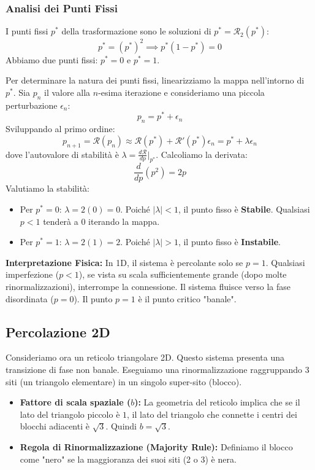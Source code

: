\subsubsection{Analisi dei Punti Fissi}
I punti fissi $p^*$ della trasformazione sono le soluzioni di $p^* = \mathcal{R}_2(p^*)$:
\begin{equation}
    p^* = (p^*)^2 \implies p^*(1 - p^*) = 0
\end{equation}
Abbiamo due punti fissi: $p^* = 0$ e $p^* = 1$.

\noindent Per determinare la natura dei punti fissi, linearizziamo la mappa nell'intorno di $p^*$. Sia $p_n$ il valore alla $n$-esima iterazione e consideriamo una piccola perturbazione $\epsilon_n$:
\begin{equation}
    p_n = p^* + \epsilon_n
\end{equation}
Sviluppando al primo ordine:
\begin{equation}
    p_{n+1} = \mathcal{R}(p_n) \approx \mathcal{R}(p^*) + \mathcal{R}'(p^*) \epsilon_n = p^* + \lambda \epsilon_n
\end{equation}
dove l'autovalore di stabilità è $\lambda = \frac{d\mathcal{R}}{dp}\big|_{p^*}$.
Calcoliamo la derivata:
\begin{equation}
    \frac{d}{dp}(p^2) = 2p
\end{equation}
Valutiamo la stabilità:
\begin{itemize}
    \item Per $p^* = 0$: $\lambda = 2(0) = 0$. Poiché $|\lambda| < 1$, il punto fisso è \textbf{Stabile}. Qualsiasi $p < 1$ tenderà a 0 iterando la mappa.
    \item Per $p^* = 1$: $\lambda = 2(1) = 2$. Poiché $|\lambda| > 1$, il punto fisso è \textbf{Instabile}.
\end{itemize}

\textbf{Interpretazione Fisica:} In 1D, il sistema è percolante solo se $p=1$. Qualsiasi imperfezione ($p < 1$), se vista su scala sufficientemente grande (dopo molte rinormalizzazioni), interrompe la connessione. Il sistema fluisce verso la fase disordinata ($p=0$). Il punto $p=1$ è il punto critico "banale".

\subsection{Percolazione 2D}

Consideriamo ora un reticolo triangolare 2D. Questo sistema presenta una transizione di fase non banale.
Eseguiamo una rinormalizzazione raggruppando 3 siti (un triangolo elementare) in un singolo super-sito (blocco).
\begin{itemize}
    \item \textbf{Fattore di scala spaziale ($b$):} La geometria del reticolo implica che se il lato del triangolo piccolo è $1$, il lato del triangolo che connette i centri dei blocchi adiacenti è $\sqrt{3}$. Quindi $b = \sqrt{3}$.
    \item \textbf{Regola di Rinormalizzazione (Majority Rule):} Definiamo il blocco come "nero" se la maggioranza dei suoi siti (2 o 3) è nera.
\end{itemize}

